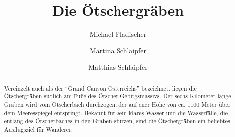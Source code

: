 \documentclass[twoside]{article}
\title{\vspace{-15mm}\fontsize{24pt}{10pt}\selectfont\textbf{Die Ötschergräben}} %
\author{%
Michael Fladischer
\and
Martina Schlaipfer
\and
Matthias Schlaipfer
\vspace{-5mm}
}
\date{}
\begin{document}
\maketitle %

\thispagestyle{fancy} %


\begin{abstract}

\noindent Vereinzelt auch als der ``Grand Canyon Österreichs'' bezeichnet, liegen die Ötschergräben
südlich am Fuße des Ötscher-Gebirgsmassivs. Der sechs Kilometer lange Graben wird vom Ötscherbach durchzogen,
der auf ener Höhe von ca. 1100 Meter über dem Meeresspiegel entspringt. Bekannt für sein klares Wasser und
die Wasserfälle, die entlang des Ötscherbaches in den Graben stürzen, sind die Ötschergräben ein beliebtes
Ausflugsziel für Wanderer.

\end{abstract}

\end{document}
